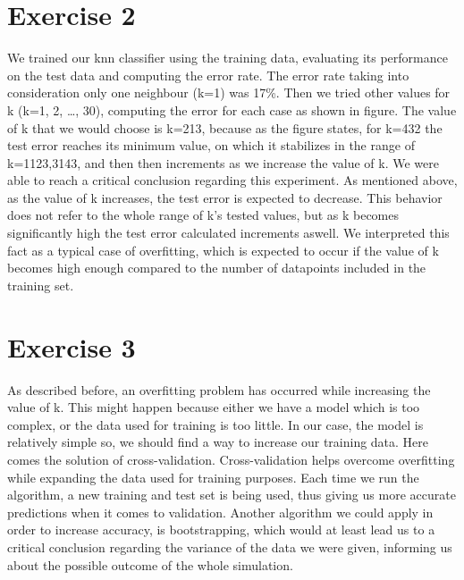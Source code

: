 \documentclass[letterpaper,11pt]{article}
\begin{document}
 \section*{Exercise 2}
We trained our knn classifier using the training data, evaluating its performance on the test data and computing the error rate. The error rate taking into consideration only one neighbour (k=1) was 17\%. Then we tried other values for k (k=1, 2, \ldots, 30), computing the error for each case as shown in figure.
The value of k that we would choose is k=213, because as the figure states, for k=432 the test error reaches its minimum value, on which it stabilizes in the range of k={1123,3143}, and then then increments as we increase the value of k. We were able to reach a critical conclusion regarding this experiment. As mentioned above, as the value of k increases, the test error is expected to decrease. This behavior does not refer to the whole range of k's tested values, but as k becomes significantly high the test error calculated increments aswell. We interpreted this fact as a typical case of overfitting, which is expected to occur if the value of k becomes high enough compared to the number of datapoints included in the training set.


 \section*{Exercise 3}
As described before, an overfitting problem has occurred while increasing the value of k. This might happen because either we have a model which is too complex, or the data used for training is too little. In our case, the model is relatively simple so, we should find a way to increase our training data. Here comes the solution of cross-validation. Cross-validation helps overcome overfitting while expanding the data used for training purposes. Each time we run the algorithm, a new training and test set is being used, thus giving us more accurate predictions when it comes to validation. Another algorithm we could apply in order to increase accuracy, is bootstrapping, which would at least lead us to a critical conclusion regarding the variance of the data we were given, informing us about the possible outcome of the whole simulation.
 

    
\end{document}
